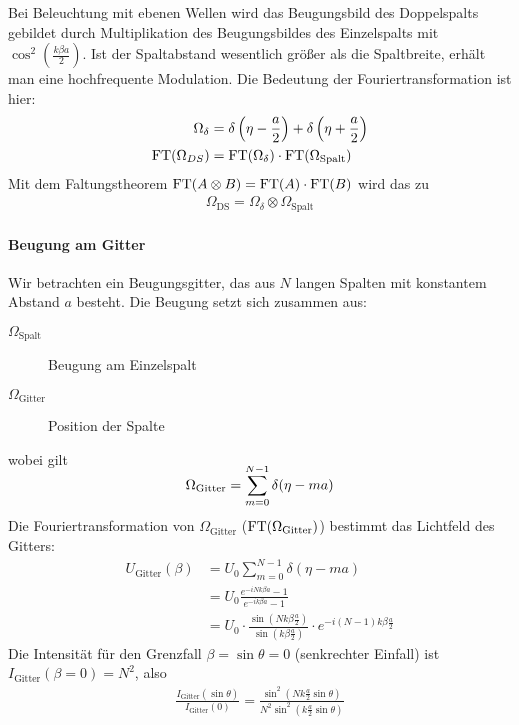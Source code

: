 Bei Beleuchtung mit ebenen Wellen wird das Beugungsbild des
Doppelspalts gebildet durch Multiplikation des Beugungsbildes des
Einzelspalts mit $\cos^2\left(\frac{k\beta a}{2}\right)$.
Ist der Spaltabstand wesentlich größer als die Spaltbreite, erhält man
eine hochfrequente Modulation.
Die Bedeutung der Fouriertransformation ist hier:
\begin{align*}
  \Omega_\delta 
  &= \delta\left( \eta-\frac{a}{2} \right) 
    +  \delta\left( \eta+\frac{a}{2} \right)\\
  \operatorname{FT}(\Omega_{DS}) 
  &= \operatorname{FT}(\Omega_\delta) \cdot \operatorname{FT}(\Omega_\text{Spalt})
\end{align*}
Mit dem Faltungstheorem 
$\operatorname{FT}(A\otimes B) = \operatorname{FT}(A)\cdot\operatorname{FT}(B)$
wird das zu
\begin{gather*}
  \Omega_\text{DS} = \Omega_\delta \otimes \Omega_\text{Spalt}
\end{gather*}



\paragraph{Beugung am Gitter}
Wir betrachten ein Beugungsgitter, das aus $N$ langen Spalten mit
konstantem Abstand $a$ besteht.
Die Beugung setzt sich zusammen aus:
\begin{description}
\item[$\Omega_\text{Spalt}$] Beugung am Einzelspalt
\item[$\Omega_\text{Gitter}$] Position der Spalte
\end{description}
wobei gilt
\begin{align*}
  \SwapAboveDisplaySkip
  \Omega_\text{Gitter} = \sum_{m=0}^{N-1}\delta(\eta-ma)
\end{align*}
Die Fouriertransformation von $\Omega_\text{Gitter}$
($\operatorname{FT}(\Omega_\text{Gitter})$) bestimmt das Lichtfeld des Gitters:
\begin{align*}
  U_\text{Gitter}(\beta) 
  &= U_0 \sum_{m=0}^{N-1} \delta(\eta-ma)\\
  &= U_0 \frac
    {e^{-iNk\beta a} - 1}
    {e^{-i k\beta a} - 1} \\
  &= U_0 \cdot \frac
    { \sin\left( Nk\beta\frac{a}{2} \right) }
    { \sin\left(  k\beta\frac{a}{2} \right) }
    \cdot e^{-i(N-1)k\beta\frac{a}{2}}
\end{align*}
Die Intensität für den Grenzfall $\beta=\sin\theta=0$ (senkrechter
Einfall) ist
$I_\text{Gitter}(\beta=0) = N^2$, also
\begin{gather*}
  \frac{ I_\text{Gitter}(\sin\theta) }{ I_\text{Gitter}(0)}
  = \frac
  {    \sin^2\left( Nk\frac{a}{2} \sin\theta \right) }
  { N^2\sin^2\left(  k\frac{a}{2} \sin\theta \right) }
\end{gather*}

